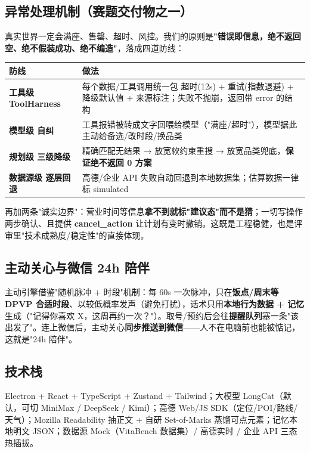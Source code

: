 \documentclass[11pt,a4paper]{ctexart}
\begin{document}
\subsection{异常处理机制（赛题交付物之一）}
真实世界一定会满座、售罄、超时、风控。我们的原则是\textbf{"错误即信息，绝不返回空、绝不假装成功、绝不编造"}，落成四道防线：

\begin{center}
{\small
\begin{tabularx}{\linewidth}{>{\bfseries}p{3.2cm} >{\raggedright\arraybackslash}X}
\toprule
防线 & 做法 \\
\midrule
工具级 ToolHarness & 每个数据/工具调用统一包 超时(12s) + 重试(指数退避) + 降级默认值 + 来源标注；失败不抛崩，返回带 error 的结构 \\
模型级 自纠 & 工具报错被转成文字回喂给模型（"满座/超时"），模型据此主动给备选/改时段/换品类 \\
规划级 三级降级 & 精确匹配无结果 → 放宽软约束重搜 → 放宽品类兜底，\textbf{保证绝不返回 0 方案} \\
数据源级 逐层回退 & 高德/企业 API 失败自动回退到本地数据集；估算数据一律标 simulated \\
\bottomrule
\end{tabularx}}
\end{center}

再加两条"诚实边界"：营业时间等信息\textbf{拿不到就标"建议态"而不是猜}；一切写操作两步确认、且提供 \textbf{cancel\_action} 让计划有变时撤销。这既是工程稳健，也是评审里"技术成熟度/稳定性"的直接体现。

\subsection{主动关心与微信 24h 陪伴}
主动引擎借鉴"随机脉冲 + 时段"机制：每 60s 一次脉冲，只在\textbf{饭点/周末等 DPVP 合适时段}、以较低概率发声（避免打扰），话术只用\textbf{本地行为数据 + 记忆}生成（"记得你喜欢 X，这周再约一次？"）。取号/预约后会往\textbf{提醒队列}塞一条"该出发了"。连上微信后，主动关心\textbf{同步推送到微信}——人不在电脑前也能被惦记，这就是"24h 陪伴"。

\subsection{技术栈}
Electron + React + TypeScript + Zustand + Tailwind；大模型 LongCat（默认，可切 MiniMax / DeepSeek / Kimi）；高德 Web/JS SDK（定位/POI/路线/天气）；Mozilla Readability 抽正文 + 自研 Set-of-Marks 蒸馏可点元素；记忆本地明文 JSON；数据源 Mock（VitaBench 数据集）/ 高德实时 / 企业 API 三态热插拔。
\end{document}
